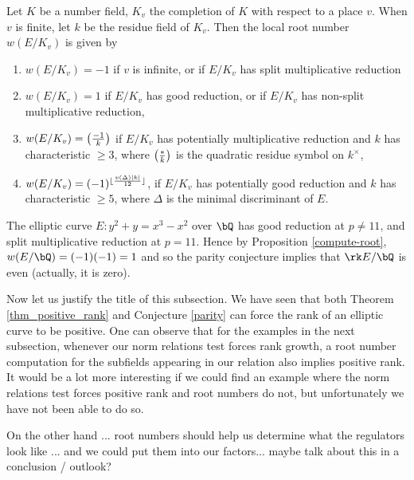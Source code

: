 \begin{prop}\cite[Theorem 3.1]{DD-BSD}\label{compute-root}
    Let $K$ be a number field, $K_v$ the completion of $K$ with respect to a place $v$. When $v$ is finite, 
    let $k$ be the residue field of $K_v$. Then the local root number $w(E / K_v)$ is given by 
    \begin{enumerate}
        \setlength\itemsep{0em}
        \item $w(E / K_v) = -1$ if $v$ is infinite, or if  $E / K_v$ has split multiplicative reduction
        \item $w(E / K_v) = 1$ if $E / K_v$ has good reduction, or if $E / K_v$ has non-split multiplicative reduction, 
        \item $w(E / K_v) = \left( \frac{-1}{k} \right) $ if $E / K_v$ has potentially multiplicative reduction and $k$ has characteristic $\geq 3$, where $\left( \frac{*}{k} \right) $ is the quadratic residue symbol on $k^{\times}$,
        \item $w(E / K_v) = (-1)^{\lfloor\frac{v(\Delta)|k|}{12}\rfloor}$, if $E / K_v$ has potentially good reduction and $k$ has characteristic $\geq 5$, where $\Delta$ is the minimal discriminant of $E$.  
    \end{enumerate} 
\end{prop}

\begin{example}
    The elliptic curve $E \colon y^2 + y = x^3  - x^2$ over $\bQ$ has good reduction at $p \not= 11$, and split multiplicative reduction at $p = 11$. Hence by Proposition \ref{compute-root}, $w(E / \bQ) = (-1)(-1) = 1$ and so the parity conjecture implies that $\rk E / \bQ$ is even (actually, it is zero). 
\end{example}

Now let us justify the title of this subsection. We have seen that both Theorem \ref{thm_positive_rank} and Conjecture \ref{parity} can force the rank of an elliptic curve to be positive. One can observe that for the examples in the next subsection, whenever our norm relations test forces rank growth, a root number computation for the subfields appearing in our relation also implies positive rank. It would be a lot more interesting if we could find an example where the norm relations test forces positive rank and root numbers do not, but unfortunately we have not been able to do so. 

{\color{red} On the other hand ... root numbers should help us determine what the regulators look like ... and we could put them into our factors... maybe talk about this in a conclusion / outlook?}

